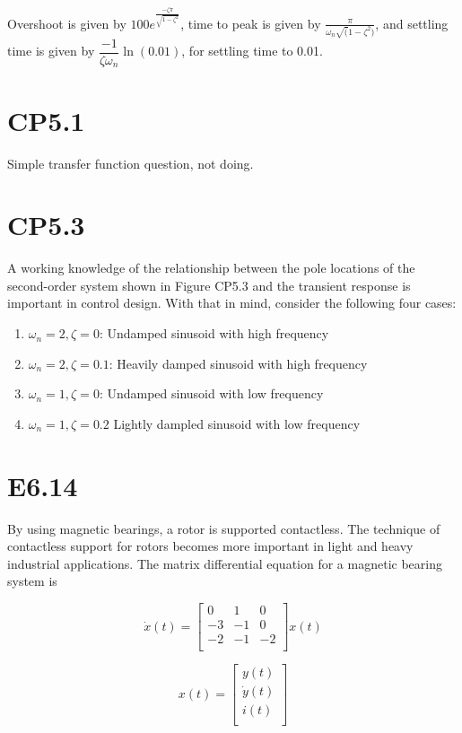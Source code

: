 \documentclass[11pt]{article}
\begin{document}
Overshoot is given by $100e^{\frac{-\zeta \pi}{\sqrt{1 - \zeta^2}}}$, time to peak is given by $\frac{\pi}{\omega_n \sqrt(1 - \zeta^2)}$, and settling time is given by $\dfrac{-1}{\zeta \omega_n} \ln (0.01)$, for settling time to 0.01.

\section{CP5.1}

Simple transfer function question, not doing.

\section{CP5.3}

A working knowledge of the relationship between the pole locations of the second-order system shown in Figure CP5.3 and the transient response is important in control design. With that in mind, consider the following four cases:

\begin{enumerate}
    \item $\omega_n = 2, \zeta = 0$: Undamped sinusoid with high frequency
    \item $\omega_n = 2, \zeta = 0.1$: Heavily damped sinusoid with high frequency
    \item $\omega_n = 1, \zeta = 0$: Undamped sinusoid with low frequency
    \item $\omega_n = 1, \zeta = 0.2$ Lightly dampled sinusoid with low frequency
\end{enumerate}

\section{E6.14}

By using magnetic bearings, a rotor is supported contactless. The technique of contactless support for rotors becomes more important in light and heavy industrial applications. The matrix differential equation for a magnetic bearing system is

\[
    \dot x(t) =
    \begin{bmatrix}
        0 & 1 & 0 \\
        -3 & -1 & 0 \\
        -2 & -1 & -2 \\
    \end{bmatrix}
    x(t)
\]

\[
    x(t) =
    \begin{bmatrix}
        y(t) \\
        \dot y(t) \\
        i(t) \\
    \end{bmatrix}
\]
\end{document}
